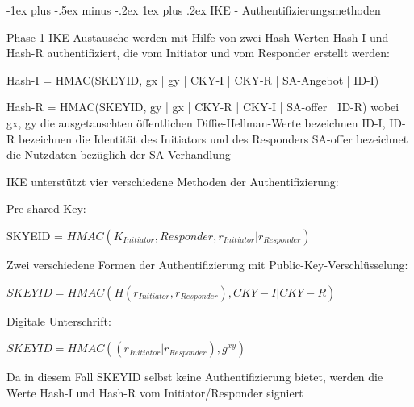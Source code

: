 \documentclass[a4paper]{article}
\makeatletter
\renewcommand{\subsubsection}{\@startsection{subsubsection}{3}{0mm}%
 {-1ex plus -.5ex minus -.2ex}%
 {1ex plus .2ex}%
 {\normalfont\small\bfseries}}
\makeatother
\begin{document}
\begin{multicols}{3}
      \subsubsection{IKE - Authentifizierungsmethoden}
      \begin{itemize*}
            \item Phase 1 IKE-Austausche werden mit Hilfe von zwei Hash-Werten Hash-I und Hash-R authentifiziert, die vom Initiator und vom Responder erstellt werden:
            \begin{itemize*}
                  \item Hash-I = HMAC(SKEYID, gx | gy | CKY-I | CKY-R | SA-Angebot | ID-I)
                  \item Hash-R = HMAC(SKEYID, gy | gx | CKY-R | CKY-I | SA-offer | ID-R) wobei gx, gy die ausgetauschten öffentlichen Diffie-Hellman-Werte bezeichnen ID-I, ID-R bezeichnen die Identität des Initiators und des Responders SA-offer bezeichnet die Nutzdaten bezüglich der SA-Verhandlung
            \end{itemize*}
            \item IKE unterstützt vier verschiedene Methoden der Authentifizierung:
            \begin{itemize*}
                  \item Pre-shared Key:
                  \begin{itemize*}
                        \item SKYEID = $HMAC(K_{Initiator}, Responder , r_{Initiator} | r_{Responder})$
                  \end{itemize*}
                  \item Zwei verschiedene Formen der Authentifizierung mit Public-Key-Verschlüsselung:
                  \begin{itemize*}
                        \item $SKEYID = HMAC(H(r_{Initiator}, r_{Responder}), CKY-I | CKY-R)$
                  \end{itemize*}
                  \item Digitale Unterschrift:
                  \begin{itemize*}
                        \item $SKEYID = HMAC((r_{Initiator} | r_{Responder}), g^{xy})$
                        \item Da in diesem Fall SKEYID selbst keine Authentifizierung bietet, werden die Werte Hash-I und Hash-R vom Initiator/Responder signiert
                  \end{itemize*}
            \end{itemize*}
      \end{itemize*}


\end{multicols}
\end{document}
